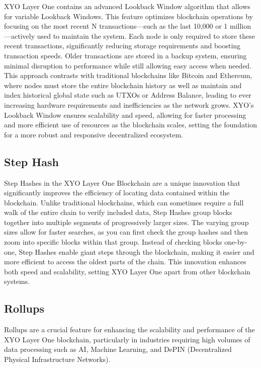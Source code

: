 \documentclass{article}
\begin{document}
XYO Layer One contains an advanced Lookback Window algorithm that allows for
variable Lookback Windows. This feature optimizes blockchain operations by
focusing on the most recent N transactions—such as the last 10,000 or 1
million—actively used to maintain the system. Each node is only required to
store these recent transactions, significantly reducing storage requirements
and boosting transaction speeds. Older transactions are stored in a backup
system, ensuring minimal disruption to performance while still allowing easy
access when needed. This approach contrasts with traditional blockchains like
Bitcoin and Ethereum, where nodes must store the entire blockchain history as
well as maintain and index historical global state such as UTXOs or Address
Balance, leading to ever increasing hardware requirements and inefficiencies as
the network grows. XYO’s Lookback Window ensures scalability and speed,
allowing for faster processing and more efficient use of resources as the
blockchain scales, setting the foundation for a more robust and responsive
decentralized ecosystem.

\subsection{Step Hash}
Step Hashes in the XYO Layer One Blockchain are a unique innovation that
significantly improves the efficiency of locating data contained within the
blockchain. Unlike traditional blockchains, which can sometimes require a full
walk of the entire chain to verify included data, Step Hashes group blocks
together into multiple segments of progressively larger sizes. The varying
group sizes allow for faster searches, as you can first check the group hashes
and then zoom into specific blocks within that group. Instead of checking
blocks one-by-one, Step Hashes enable giant steps through the blockchain,
making it easier and more efficient to access the oldest parts of the chain.
This innovation enhances both speed and scalability, setting XYO Layer One
apart from other blockchain systems.

\subsection{Rollups}
Rollups are a crucial feature for enhancing the scalability and performance of
the XYO Layer One blockchain, particularly in industries requiring high volumes
of data processing such as AI, Machine Learning, and DePIN (Decentralized
Physical Infrastructure Networks).
\end{document}
